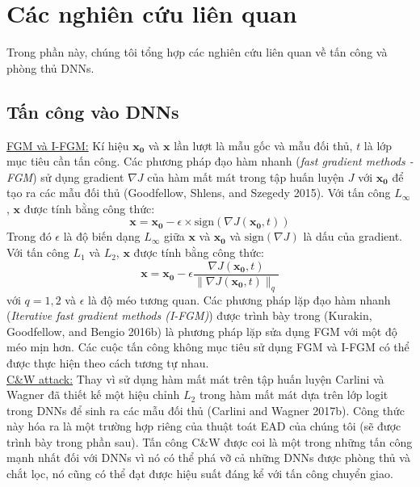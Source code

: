 \chapter{Các nghiên cứu liên quan}
Trong phần này, chúng tôi tổng hợp các nghiên cứu liên quan về tấn công và phòng thủ DNNs.

\section{Tấn công vào DNNs}
\underline{FGM và I-FGM:} Kí hiệu $\mathbf{x_0}$ và $\mathbf{x}$ lần lượt là mẫu gốc và mẫu đối thủ,
$t$ là lớp mục tiêu cần tấn công. Các phương pháp đạo hàm nhanh (\textit{fast gradient 
methods - FGM}) sử dụng gradient $\nabla J$ của hàm mất mát trong tập huấn luyện $J$ với $\mathbf{x_0}$
để tạo ra các mẫu đối thủ (Goodfellow, Shlens, and Szegedy 2015). Với tấn công $L_{\infty}$, 
$\mathbf{x}$ được tính bằng công thức:
\begin{equation}
    \mathbf{x} = \mathbf{x_0} - \epsilon \times \text{sign}(\nabla J(\mathbf{x_0}, t))
\end{equation}
Trong đó $\epsilon$ là độ biến dạng $L_{\infty}$ giữa $\mathbf{x}$ và $\mathbf{x_0}$ và 
$\text{sign}(\nabla J)$ là dấu của gradient. Với tấn công $L_1$ và $L_2$, $\mathbf{x}$ 
được tính bằng công thức:
\begin{equation}
    \mathbf{x} = \mathbf{x_0} - \epsilon \frac{\nabla J(\mathbf{x_0}, t)}
    {\lVert \nabla J(\mathbf{x_0}, t) \rVert _q}
\end{equation}
với $q = 1,2$ và $\epsilon$ là độ méo tương quan. Các phương pháp lặp đạo hàm nhanh 
(\textit{Iterative fast gradient methods (I-FGM)}) được trình bày trong (Kurakin, Goodfellow, 
and Bengio 2016b) là phương pháp lặp sửa dụng FGM với một độ méo mịn hơn. Các cuộc tấn công 
không mục tiêu sử dụng FGM và I-FGM có thể được thực hiện theo cách tương tự nhau. \\

\underline{C\&W attack:} Thay vì sử dụng hàm mất mát trên tập huấn luyện Carlini và Wagner
đã thiết kế  một hiệu chỉnh $L_2$ trong hàm mất mát dựa trên lớp logit trong DNNs để sinh 
ra các mẫu đối thủ (Carlini and Wagner 2017b). Công thức này hóa ra là một trường hợp riêng của 
thuật toát EAD của chúng tôi (sẽ được trình bày trong phần sau). Tấn công C\&W được coi 
là một trong những tấn công mạnh nhất đối với DNNs vì nó có thể phá vỡ cả những DNNs được 
phòng thủ và chắt lọc, nó cũng có thể đạt được hiệu suất đáng kể với tấn công chuyển giao. \\

